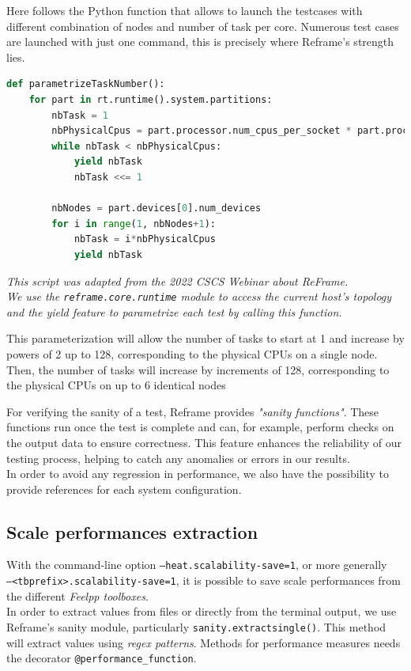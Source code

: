 \documentclass[12pt]{article}
\begin{document}
Here follows the Python function that allows to launch the testcases with different combination of nodes and number of task per core.
Numerous test cases are launched with just one command, this is precisely where Reframe's strength lies. \\

\begin{scriptsize}
\begin{lstlisting}[language=python,caption={Task number parametrization}]
def parametrizeTaskNumber():
    for part in rt.runtime().system.partitions:
        nbTask = 1
        nbPhysicalCpus = part.processor.num_cpus_per_socket * part.processor.num_sockets
        while nbTask < nbPhysicalCpus:
            yield nbTask
            nbTask <<= 1

        nbNodes = part.devices[0].num_devices
        for i in range(1, nbNodes+1):
            nbTask = i*nbPhysicalCpus
            yield nbTask
\end{lstlisting}
\end{scriptsize}

\textit{This script was adapted from the 2022 CSCS Webinar \cite{CSCS} about ReFrame. \\
        We use the \texttt{reframe.core.runtime} module to access the current host's topology and the yield feature to parametrize each test by calling this function.}

This parameterization will allow the number of tasks to start at 1 and increase by powers of 2 up to 128, corresponding to the physical CPUs on a single node. 
Then, the number of tasks will increase by increments of 128, corresponding to the physical CPUs on up to 6 identical nodes

For verifying the sanity of a test, Reframe provides \textit{"sanity functions"}. These functions run once the test is complete and can, for example, perform checks on the output data to ensure correctness. 
This feature enhances the reliability of our testing process, helping to catch any anomalies or errors in our results. \\
In order to avoid any regression in performance, we also have the possibility to provide references for each system configuration.

\newpage
\subsection{Scale performances extraction}

With the command-line option \small{\texttt{--heat.scalability-save=1}}, or more generally \\ \small{\texttt{--<tbprefix>.scalability-save=1}}, it is possible to save scale performances from the different \textit{Feelpp toolboxes}. \\
In order to extract values from files or directly from the terminal output, we use Reframe's sanity module, particularly \texttt{sanity.extractsingle()}.
This method will extract values using \textit{regex patterns}. Methods for performance measures needs the decorator \small{\texttt{@performance\_function}}.
\end{document}
